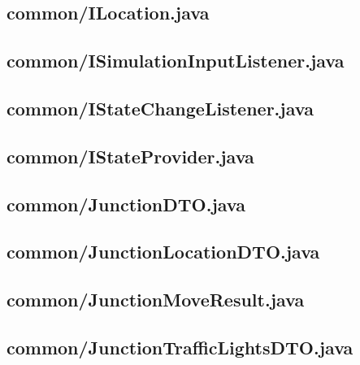 \subsection{common/ILocation.java}

\newpage
\subsection{common/ISimulationInputListener.java}

\newpage
\subsection{common/IStateChangeListener.java}

\newpage
\subsection{common/IStateProvider.java}

\newpage
\subsection{common/JunctionDTO.java}

\newpage
\subsection{common/JunctionLocationDTO.java}

\newpage
\subsection{common/JunctionMoveResult.java}

\newpage
\subsection{common/JunctionTrafficLightsDTO.java}

\newpage
